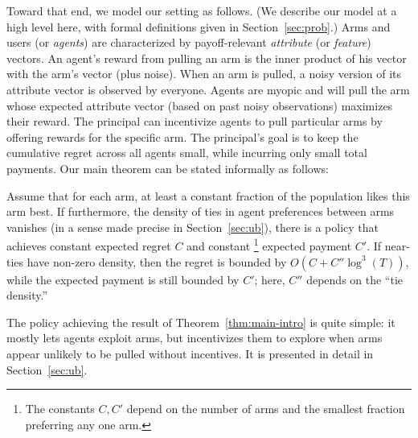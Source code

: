 Toward that end, we model our setting as follows.
(We describe our model at a high level here,
with formal definitions given in Section~\ref{sec:prob}.)
Arms and users (or \emph{agents}) are characterized by payoff-relevant
\emph{attribute} (or \emph{feature}) vectors.
An agent's reward from pulling an arm is the inner product of his
vector with the arm's vector (plus noise).
When an arm is pulled, a noisy version of its attribute vector is
observed by everyone.
Agents are myopic and will pull the arm whose expected attribute
vector (based on past noisy observations) maximizes their reward.
The principal can incentivize agents to pull particular arms by
offering rewards for the specific arm.
The principal's goal is to keep the cumulative regret across all
agents small, while incurring only small total payments.
Our main theorem can be stated informally as follows:

\begin{theorem} \label{thm:main-intro}
Assume that for each arm, at least a constant fraction of the
population likes this arm best.
If furthermore, the density of ties in agent preferences between arms
vanishes (in a sense made precise in Section~\ref{sec:ub}),
there is a policy that achieves constant
expected regret $C$ and constant%
\footnote{The constants $C,C'$ depend on the number of arms and the
  smallest fraction preferring any one arm.} expected payment $C'$.
If near-ties have non-zero density,
then the regret is bounded by $O(C + C'' \log^3(T))$,
while the expected payment is still bounded by $C'$;
here, $C''$ depends on the ``tie density.''
\end{theorem}

The policy achieving the result of Theorem~\ref{thm:main-intro} is
quite simple: it mostly lets agents exploit arms, but incentivizes
them to explore when arms appear unlikely to be pulled without incentives.
It is presented in detail in Section~\ref{sec:ub}.

